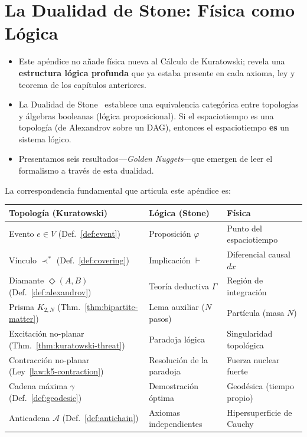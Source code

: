 \documentclass[11pt, a4paper, openany]{book}
\newcommand{\covers}{\prec^{\!*}}
\newcommand{\diam}[2]{\Diamond(#1,#2)}
\newenvironment{introduction}[1][Sinopsis del M\'odulo]{%
  \begin{tcolorbox}[
    enhanced,colback=structure!5,colframe=structure,
    colbacktitle=structure,coltitle=white,
    fonttitle=\small\bfseries,title={#1},
    arc=2pt,boxrule=0.7pt,
    left=8pt,right=8pt,top=6pt,bottom=6pt,
    before skip=12pt,after skip=12pt
  ]\itshape\begin{itemize}[leftmargin=*,itemsep=2pt,parsep=0pt]
}{%
  \end{itemize}\end{tcolorbox}
}
\begin{document}

\chapter{La Dualidad de Stone: F\'isica como L\'ogica}
\label{app:stone-duality}

\begin{introduction}[Una Lente Inesperada]
  \item Este ap\'endice no a\~nade f\'isica nueva al C\'alculo de
        Kuratowski; revela una \textbf{estructura l\'ogica profunda} que
        ya estaba presente en cada axioma, ley y teorema de los
        cap\'itulos anteriores.
  \item La Dualidad de Stone~\cite{stone1936,stone1937,johnstone1982}
        establece una equivalencia categ\'orica entre topolog\'ias y
        \'algebras booleanas (l\'ogica proposicional). Si el
        espaciotiempo es una topolog\'ia (de Alexandrov sobre un DAG),
        entonces el espaciotiempo \textbf{es} un sistema l\'ogico.
  \item Presentamos seis resultados---\emph{Golden Nuggets}---que
        emergen de leer el formalismo a trav\'es de esta dualidad.
\end{introduction}

\noindent
La correspondencia fundamental que articula este ap\'endice es:

\medskip
\begin{center}
\begin{tabular}{p{4.5cm}ll}
\toprule
\textbf{Topolog\'ia (Kuratowski)} & \textbf{L\'ogica (Stone)} &
  \textbf{F\'isica}\\
\midrule
Evento $e \in V$ (Def.~\ref{def:event})
  & Proposici\'on $\varphi$ & Punto del espaciotiempo\\
V\'inculo $\covers$ (Def.~\ref{def:covering})
  & Implicaci\'on $\vdash$
  & Diferencial causal $dx$\\
Diamante $\diam{A}{B}$ (Def.~\ref{def:alexandrov})
  & Teor\'ia deductiva $\Gamma$
  & Regi\'on de integraci\'on\\
Prisma $K_{2,N}$ (Thm.~\ref{thm:bipartite-matter})
  & Lema auxiliar ($N$ pasos)
  & Part\'icula (masa $N$)\\
Excitaci\'on no-planar (Thm.~\ref{thm:kuratowski-threat})
  & Paradoja l\'ogica
  & Singularidad topol\'ogica\\
Contracci\'on no-planar (Ley~\ref{law:k5-contraction})
  & Resoluci\'on de la paradoja
  & Fuerza nuclear fuerte\\
Cadena m\'axima $\gamma$ (Def.~\ref{def:geodesic})
  & Demostraci\'on \'optima
  & Geod\'esica (tiempo propio)\\
Anticadena $\mathcal{A}$ (Def.~\ref{def:antichain})
  & Axiomas independientes
  & Hipersuperficie de Cauchy\\
\bottomrule
\end{tabular}
\end{center}
\end{document}
